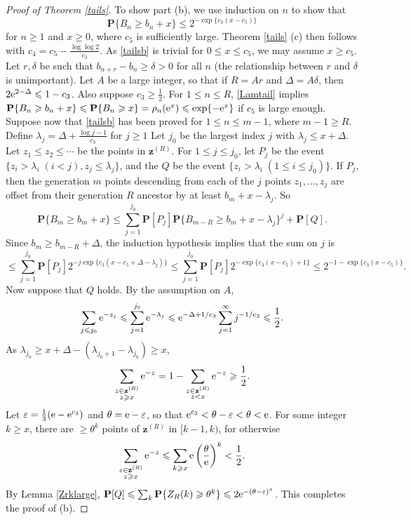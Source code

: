 \documentclass[12pt]{amsart}
\theoremstyle{remark}
\theoremstyle{plain}
\numberwithin{equation}{section}
\newcommand{\PPP}{\mathbf P}
\newcommand{\be}{\begin{equation}}
\newcommand{\ee}{\end{equation}}
\renewcommand{\th}{\ensuremath{\theta}}
\newcommand{\lam}{\ensuremath{\lambda}}
\newcommand{\del}{\ensuremath{\delta}}
\newcommand{\eps}{\ensuremath{\varepsilon}}
\renewcommand{\(}{\left(}
\renewcommand{\)}{\right)}
\newcommand{\pfrac}[2]{\left(\frac{#1}{#2}\right)}
\newcommand{\zz}{\ensuremath{\mathbf{z}}}
\newcommand{\er}{{\rm e}}  %
\renewcommand{\le}{\leqslant}
\renewcommand{\ge}{\geqslant}
\begin{document}
\begin{proof}[Proof of Theorem \ref{tails}]
To show part (b), we use induction on $n$ to show that
\be\label{tailsb} 
\PPP \{ B_n \ge b_n + x \} \le 2^{-\exp \{ c_3(x-c_5) \}}  
\ee 
for $n\ge 1$ and $x\ge 0$, where $c_5$ is sufficiently large.
Theorem \ref{tails} (c) then
follows with $c_4=c_5 - \frac{\log\log 2}{c_3}$.  As
\eqref{tailsb} is trivial for $0\le x \le c_5$, we may assume
$x\ge c_5$.   Let $r,\del$ be such that
$b_{n+r}-b_n \ge \del>0$ for all $n$ (the relationship between $r$ and
$\del$ is unimportant).
Let $A$ be a large integer, so that if $R=Ar$ and $\Delta=A\del$, then
$2\er^{2-\Delta} \le 1-c_3$.
Also suppose $c_3 \ge \frac12$.
For $1\le n\le R$, \eqref{Lamtail} implies
$\PPP \{ B_n \ge b_n+x \} \le \PPP \{ B_n \ge x \} = \rho_n(\er^x)
\le \exp \{ -\er^x \}$
if $c_5$ is large enough.  Suppose now that \eqref{tailsb} has been
proved for $1\le n\le m-1$, where $m-1\ge R$.
Define $\lam_j = \Delta + \frac{\log j - 1}{c_3}$ for $j\ge 1$
Let $j_0$ be the largest index $j$ with $\lam_j \le x+\Delta$.  
Let $z_1 \le z_2 \le \cdots$ be the points in $\zz^{(R)}$.  
For $1\le j\le j_0$, let $P_j$ be the event 
$\{z_i>\lam_i \; (i<j), z_j\le\lam_j\}$, and the $Q$ be the event
$\{z_i>\lam_i \; (1\le i\le j_0)\}$.  If $P_j$, then the generation $m$ points
descending from each of the $j$ points $z_1,\ldots,z_j$ are offset from their
generation $R$ ancestor by at least $b_m+x-\lam_j$. So
\[
\PPP \{ B_m \ge b_m + x \} \le \sum_{j=1}^{j_0} \PPP [P_j] \PPP \{ B_{m-R}
\ge b_m+x-\lam_j \}^j + \PPP [ Q ].
\]
Since $b_m \ge b_{m-R}+\Delta$, the induction hypothesis implies that the sum
on $j$ is
\[
\le  \sum_{j=1}^{j_0} \PPP [P_j] 2^{-j \exp\{c_3(x-c_5+\Delta-\lam_j)\}}
\le  \sum_{j=1}^{j_0} \PPP [P_j] 2^{-\exp\{c_3(x-c_5)+1\}}
\le 2^{-1-\exp\{c_3(x-c_5)\}}.
\]
Now suppose that $Q$ holds.  By the assumption on $A$,
$$
\sum_{j\le j_0} \er^{-z_j} \le \sum_{j=1}^{j_0} \er^{-\lam_j} \le
\er^{-\Delta+1/c_3} \sum_{j=1}^\infty j^{-1/c_3} \le \frac12.
$$
As $\lam_{j_0} \ge x+\Delta - (\lam_{j_0+1}-\lam_{j_0}) \ge x$,
$$
\sum_{\substack{z\in\zz^{(R)} \\ z\ge x }} \er^{-z} = 1 - 
\sum_{\substack{z\in\zz^{(R)} \\ z< x }} \er^{-z} \ge \frac12.
$$
Let $\eps=\frac13(\er-\er^{c_3})$ and $\th=\er-\eps$, so that $\er^{c_3}
<\theta-\eps < \theta < \er$.
For some integer $k\ge x$, there are $\ge \theta^k$ points of $\zz^{(R)}$ in
$[k-1,k)$, for otherwise
$$
\sum_{\substack{z\in\zz^{(R)} \\ z\ge x }} \er^{-z} \le \sum_{k\ge x}
\er \pfrac{\theta}{\er}^k < \frac12.
$$
By Lemma \ref{Zrklarge}, $\PPP[Q]\le \sum_k\PPP \{ Z_R(k) \ge \theta^k \} \le 
2\er^{ - (\theta-\eps)^x}$. 
This completes the proof of (b).
\end{proof}
\end{document}
